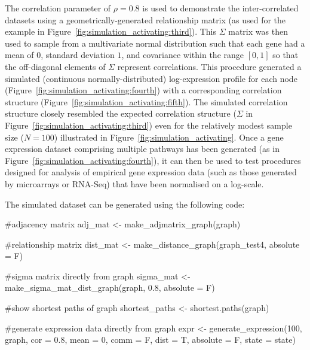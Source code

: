 \documentclass[article, shortnames]{jss}
\begin{document}
The correlation parameter of $\rho = 0.8$ is used to demonstrate the inter-correlated datasets using a geometrically-generated relationship matrix (as used for the example in Figure~\ref{fig:simulation_activating:third}). This $\Sigma$ matrix was then used to sample from a multivariate normal distribution such that each gene had a mean of $0$, standard deviation $1$, and covariance within the range $[0,1]$ so that the off-diagonal elements of $\Sigma$ represent correlations. This procedure generated a simulated (continuous normally-distributed) log-expression profile for each node (Figure~\ref{fig:simulation_activating:fourth}) with a corresponding correlation structure (Figure~\ref{fig:simulation_activating:fifth}). The simulated correlation structure closely resembled the expected correlation structure ($\Sigma$ in Figure~\ref{fig:simulation_activating:third}) even for the relatively modest sample size ($N=100$) illustrated in Figure~\ref{fig:simulation_activating}. Once a gene expression dataset comprising multiple pathways has been generated (as in Figure~\ref{fig:simulation_activating:fourth}), 
it can then be used to test procedures designed for analysis of empirical gene expression data (such as those generated by microarrays or RNA-Seq) that have been normalised on a log-scale.

The simulated dataset can be generated using the following  code:

\begin{CodeChunk}
\begin{CodeInput}
#adjacency matrix
adj\_mat <- make\_adjmatrix\_graph(graph)
  
#relationship matrix
dist\_mat <- make\_distance\_graph(graph\_test4, absolute = F)

#sigma matrix directly from graph
sigma\_mat <- make\_sigma\_mat\_dist\_graph(graph, 0.8, absolute = F)

#show shortest paths of graph
shortest\_paths <- shortest.paths(graph)

#generate expression data directly from graph
expr <- generate\_expression(100, graph, cor = 0.8, mean = 0, comm = F,
                            dist = T, absolute = F, state = state)
\end{CodeInput}
\end{CodeChunk}
\end{document}
